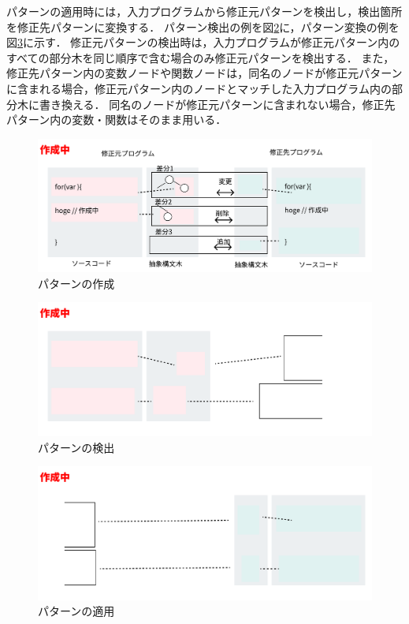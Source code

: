\documentclass[11pt]{jreport}
\begin{document}
パターンの適用時には，入力プログラムから修正元パターンを検出し，検出箇所を修正先パターンに変換する．
パターン検出の例を図\ref{fig:pattern:match}に，パターン変換の例を図\ref{fig:pattern:repair}に示す．
修正元パターンの検出時は，入力プログラムが修正元パターン内のすべての部分木を同じ順序で含む場合のみ修正元パターンを検出する．
また，修正先パターン内の変数ノードや関数ノードは，同名のノードが修正元パターンに含まれる場合，修正元パターン内のノードとマッチした入力プログラム内の部分木に書き換える．
同名のノードが修正元パターンに含まれない場合，修正先パターン内の変数・関数はそのまま用いる．


\begin{figure}[t]
\centerline{\includegraphics[width=0.8\linewidth]{Omori_fig/pattern-create.pdf}}
\caption{パターンの作成}
\label{fig:pattern:create}
\end{figure}

\begin{figure}[t]
\centerline{\includegraphics[width=0.8\linewidth]{Omori_fig/pattern-match.pdf}}
\caption{パターンの検出}
\label{fig:pattern:match}
\end{figure}

\begin{figure}[t]
\centerline{\includegraphics[width=0.8\linewidth]{Omori_fig/pattern-repair.pdf}}
\caption{パターンの適用}
\label{fig:pattern:repair}
\end{figure}
\end{document}
